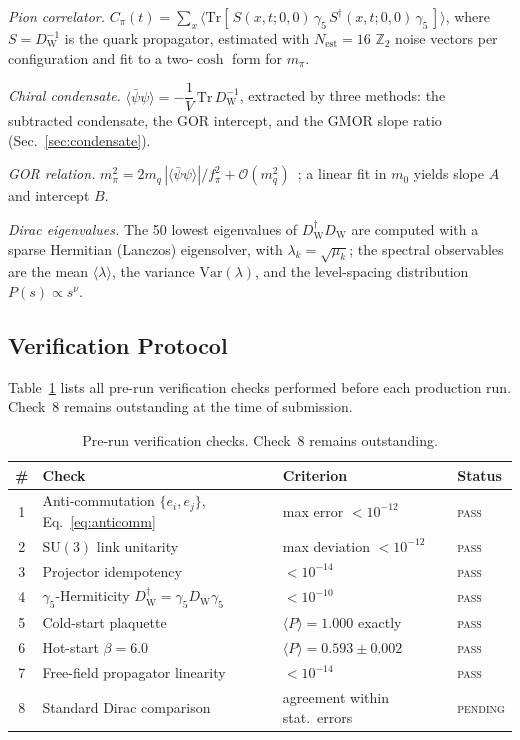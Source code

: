 \documentclass[12pt]{article}
\newcommand{\su}{\mathrm{SU}}
\newcommand{\tr}{\mathrm{Tr}}
\newcommand{\dW}{D_{\mathrm{W}}}       %
\begin{document}
\smallskip
\noindent\textit{Pion correlator.}\enspace
$C_\pi(t) = \sum_{x}\bigl\langle
\tr[\,S(x,t;0,0)\,\gamma_5\,S^\dagger(x,t;0,0)\,\gamma_5\,]\bigr\rangle$,
where $S=\dW^{-1}$ is the quark propagator, estimated with
$N_{\mathrm{est}}=16$ $\mathbb{Z}_2$ noise vectors per configuration and
fit to a two-$\cosh$ form for $m_\pi$.

\smallskip
\noindent\textit{Chiral condensate.}\enspace
$\langle\bar\psi\psi\rangle = -\dfrac{1}{V}\,\tr\,\dW^{-1}$, extracted by
three methods: the subtracted condensate, the GOR intercept, and the
GMOR slope ratio (Sec.~\ref{sec:condensate}).

\smallskip
\noindent\textit{GOR relation.}\enspace
$m_\pi^2 = 2 m_q\,|\langle\bar\psi\psi\rangle|/f_\pi^2
+ \mathcal{O}(m_q^2)$~\cite{GellMann1968}; a linear fit in $m_0$ yields
slope $A$ and intercept $B$.

\smallskip
\noindent\textit{Dirac eigenvalues.}\enspace
The 50 lowest eigenvalues of $\dW^\dagger\dW$ are computed with a sparse
Hermitian (Lanczos) eigensolver, with $\lambda_k=\sqrt{\mu_k}$; the
spectral observables are the mean $\langle\lambda\rangle$, the variance
$\mathrm{Var}(\lambda)$, and the level-spacing distribution
$P(s)\propto s^{\nu}$.

\subsection{Verification Protocol}
\label{sec:verification}

Table~\ref{tab:checks} lists all pre-run verification checks performed
before each production run.  Check~8 remains outstanding at the time of
submission.

\begin{table}[ht]
\centering
\caption{Pre-run verification checks.  Check~8 remains outstanding.}
\label{tab:checks}
\begin{tabular}{@{}clll@{}}
  \toprule
  \textbf{\#} & \textbf{Check} & \textbf{Criterion} & \textbf{Status} \\
  \midrule
  1 & Anti-commutation $\{e_i,e_j\}$, Eq.~\eqref{eq:anticomm}
      & max error $< 10^{-12}$   & \textsc{pass} \\
  2 & $\su(3)$ link unitarity
      & max deviation $< 10^{-12}$ & \textsc{pass} \\
  3 & Projector idempotency
      & $< 10^{-14}$             & \textsc{pass} \\
  4 & $\gamma_5$-Hermiticity $\dW^\dagger=\gamma_5\dW\gamma_5$
      & $< 10^{-10}$             & \textsc{pass} \\
  5 & Cold-start plaquette
      & $\langle P\rangle=1.000$ exactly & \textsc{pass} \\
  6 & Hot-start $\beta=6.0$
      & $\langle P\rangle=0.593\pm0.002$ & \textsc{pass} \\
  7 & Free-field propagator linearity
      & $< 10^{-14}$             & \textsc{pass} \\
  8 & Standard Dirac comparison
      & agreement within stat.\ errors & \textsc{pending} \\
  \bottomrule
\end{tabular}
\end{table}
\end{document}
